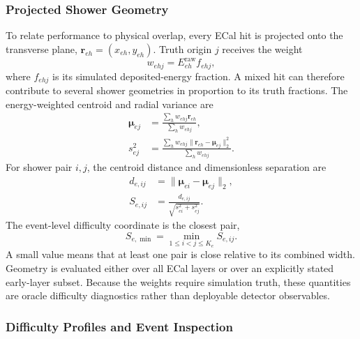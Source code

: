 \subsubsection{Projected Shower Geometry}

To relate performance to physical overlap, every ECal hit is projected onto
the transverse plane, \(\boldsymbol r_{eh}=(x_{eh},y_{eh})\). Truth origin
\(j\) receives the weight
\begin{equation}
    w_{ehj}=E_{eh}^{\mathrm{raw}}f_{ehj},
    \label{eq:shower_geometry_weight}
\end{equation}
where \(f_{ehj}\) is its simulated deposited-energy fraction. A mixed hit can
therefore contribute to several shower geometries in proportion to its truth
fractions. The energy-weighted centroid and radial variance are
\begin{align}
    \boldsymbol{\mu}_{ej}
    &=
    \frac{\sum_h w_{ehj}\boldsymbol r_{eh}}
         {\sum_h w_{ehj}},
    \label{eq:projected_shower_centroid} \\
    s_{ej}^{2}
    &=
    \frac{\sum_h w_{ehj}
    \lVert\boldsymbol r_{eh}-\boldsymbol\mu_{ej}\rVert_2^2}
         {\sum_h w_{ehj}}.
    \label{eq:projected_shower_width}
\end{align}
For shower pair \(i,j\), the centroid distance and dimensionless separation
are
\begin{align}
    d_{e,ij}
    &=
    \lVert\boldsymbol\mu_{ei}-\boldsymbol\mu_{ej}\rVert_2,
    \label{eq:shower_centroid_distance} \\
    S_{e,ij}
    &=
    \frac{d_{e,ij}}{\sqrt{s_{ei}^{2}+s_{ej}^{2}}}.
    \label{eq:normalised_shower_separation}
\end{align}
The event-level difficulty coordinate is the closest pair,
\begin{equation}
     S_{e,\min}=\min_{1\leq i<j\leq K_e}S_{e,ij}.
    \label{eq:min_shower_separation}
\end{equation}
A small value means that at least one pair is close relative to its combined
width. Geometry is evaluated either over all ECal layers or over an explicitly
stated early-layer subset. Because the weights require simulation truth, these
quantities are oracle difficulty diagnostics rather than deployable detector
observables.

\subsubsection{Difficulty Profiles and Event Inspection}

